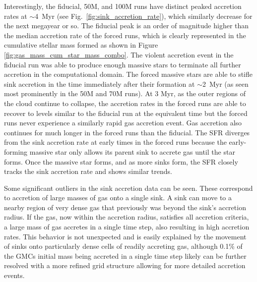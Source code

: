 \documentclass[twoside]{drexel-thesis}
\begin{document}
\begin{thesis}
Interestingly, the fiducial, 50M, and 100M runs have distinct peaked accretion rates at $\sim$4~Myr (see Fig.~\ref{fig:sink_accretion_rate}), which similarly decrease for the next megayear or so. The fiducial peak is an order of magnitude higher than the median accretion rate of the forced runs, which is clearly represented in the cumulative stellar mass formed as shown in Figure \ref{fig:gas_mass_cum_star_mass_combo}. The violent accretion event in the fiducial run was able to produce enough massive stars to terminate all further accretion in the computational domain. The forced massive stars are able to stifle sink accretion in the time immediately after their formation at $\sim$2~Myr (as seen most prominently in the 50M and 70M runs). At 3 Myr, as the outer regions of the cloud continue to collapse, the accretion rates in the forced runs are able to recover to levels similar to the fiducial run at the equivalent time but the forced runs never experience a similarly rapid gas accretion event. Gas accretion also continues for much longer in the forced runs than the fiducial. The SFR diverges from the sink accretion rate at early times in the forced runs because the early-forming massive star only allows its parent sink to accrete gas until the star forms. Once the massive star forms, and as more sinks form, the SFR closely tracks the sink accretion rate and shows similar trends. 

Some significant outliers in the sink accretion data can be seen. These correspond to accretion of large masses of gas onto a single sink. A sink can move to a nearby region of very dense gas that previously was beyond the sink's accretion radius. If the gas, now within the accretion radius, satisfies all accretion criteria, a large mass of gas accretes in a single time step, also resulting in high accretion rates. 
This behavior is not unexpected and is easily explained by the movement of sinks onto particularly dense cells of readily accreting gas, although 0.1\% of the GMCs initial mass being accreted in a single time step likely can be further resolved with a more refined grid structure allowing for more detailed accretion events.


\end{thesis}
\end{document}
